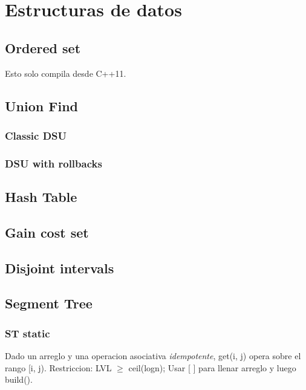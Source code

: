 \newpage
\section{Estructuras de datos}

\subsection{Ordered set}
Esto solo compila desde C++11.


\subsection{Union Find}

\subsubsection{Classic DSU}


\subsubsection{DSU with rollbacks}


\newpage
\subsection{Hash Table}


\subsection{Gain cost set}


\subsection{Disjoint intervals}


\subsection{Segment Tree}
\subsubsection{ST static}
Dado un arreglo y una operacion asociativa \emph{idempotente}, get(i, j) opera sobre el rango [i, j). Restriccion: LVL $\ge$ ceil(logn); Usar [ ] para llenar arreglo y luego build().


